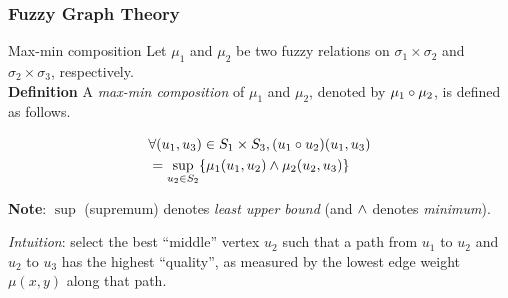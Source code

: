 \begin{frame}
	\frametitle{Fuzzy Graph Theory}

	\begin{block}{Max-min composition}
		Let $\mu_1$ and $\mu_2$ be two fuzzy relations on $\sigma_1 \times \sigma_2$ and $\sigma_2 \times \sigma_3$, respectively. \\
		\textbf{Definition} A \textit{max-min composition} of $\mu_1$ and $\mu_2$, denoted by $\mu_1 \circ \mu_2$, is defined as follows.

		\begin{equation}
			\begin{aligned}
				& \forall (u_1, u_3) \in S_1 \times S_3, (u_1 \circ u_2) (u_1, u_3) \\
				& = \sup_{u_2 \in S_2}\{ \mu_1(u_1, u_2) \land \mu_2(u_2, u_3) \}
			\end{aligned}
			\label{eq:min_max_composition}
		\end{equation}

		\textbf{Note}: $\sup$ (supremum) denotes \textit{least upper bound} (and $\land$ denotes \textit{minimum}).

		\vspace*{2em}

		\textit{Intuition}: select the best ``middle'' vertex $u_2$ such that a path from $u_1$ to $u_2$ and $u_2$ to $u_3$ has the highest ``quality'', as measured by the lowest edge weight $\mu(x, y)$ along that path.
	\end{block}
\end{frame}

